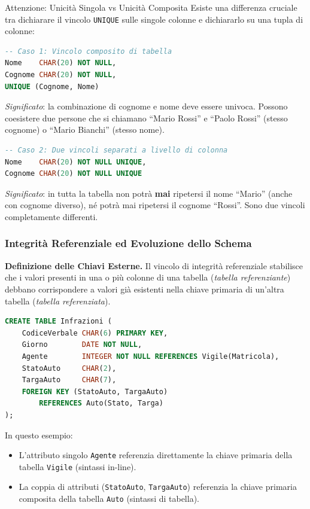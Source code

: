 \documentclass[12pt]{extarticle}
\begin{document}
\begin{cbox}{Attenzione: Unicità Singola vs Unicità Composita}
\noindent Esiste una differenza cruciale tra dichiarare il vincolo \texttt{UNIQUE} sulle singole colonne e dichiararlo su una tupla di colonne:
\begin{lstlisting}[language=SQL]
-- Caso 1: Vincolo composito di tabella
Nome    CHAR(20) NOT NULL,
Cognome CHAR(20) NOT NULL,
UNIQUE (Cognome, Nome)
\end{lstlisting}
\textit{Significato}: la combinazione di cognome e nome deve essere univoca. Possono coesistere due persone che si chiamano ``Mario Rossi'' e ``Paolo Rossi'' (stesso cognome) o ``Mario Bianchi'' (stesso nome).

\begin{lstlisting}[language=SQL]
-- Caso 2: Due vincoli separati a livello di colonna
Nome    CHAR(20) NOT NULL UNIQUE,
Cognome CHAR(20) NOT NULL UNIQUE
\end{lstlisting}
\textit{Significato}: in tutta la tabella non potrà \textbf{mai} ripetersi il nome ``Mario'' (anche con cognome diverso), né potrà mai ripetersi il cognome ``Rossi''. Sono due vincoli completamente differenti.
\end{cbox}

\subsubsection{Integrità Referenziale ed Evoluzione dello Schema}
\noindent \textbf{Definizione delle Chiavi Esterne.} Il vincolo di integrità referenziale stabilisce che i valori presenti in una o più colonne di una tabella (\textit{tabella referenziante}) debbano corrispondere a valori già esistenti nella chiave primaria di un'altra tabella (\textit{tabella referenziata}).
\begin{lstlisting}[language=SQL]
CREATE TABLE Infrazioni (
    CodiceVerbale CHAR(6) PRIMARY KEY,
    Giorno        DATE NOT NULL,
    Agente        INTEGER NOT NULL REFERENCES Vigile(Matricola),
    StatoAuto     CHAR(2),
    TargaAuto     CHAR(7),
    FOREIGN KEY (StatoAuto, TargaAuto) 
        REFERENCES Auto(Stato, Targa)
);
\end{lstlisting}
In questo esempio:
\begin{itemize}
    \item L'attributo singolo \texttt{Agente} referenzia direttamente la chiave primaria della tabella \texttt{Vigile} (sintassi in-line).
    \item La coppia di attributi (\texttt{StatoAuto}, \texttt{TargaAuto}) referenzia la chiave primaria composita della tabella \texttt{Auto} (sintassi di tabella).
\end{itemize}
\end{document}
